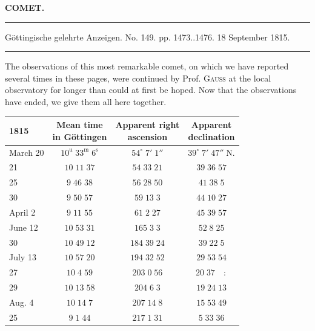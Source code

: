 \clearpage{}\hypertarget{native-394-lower}{}\label{native-394-lower}
\begin{center}\textbf{COMET.}\par\vspace{4pt}\hrule\vspace{4pt}\fontsize{10}{12}\selectfont Göttingische gelehrte Anzeigen. No. 149. pp. 1473..1476. 18 September 1815.\par\vspace{4pt}\hrule\vspace{4pt}\end{center}

\par\indent The observations of this most remarkable comet, on which we have reported several times in these pages, were continued by Prof. \textsc{Gauss} at the local observatory for longer than could at first be hoped. Now that the observations have ended, we give them all here together.

\begin{center}\fontsize{10}{12}\selectfont\setlength{\tabcolsep}{5pt}\renewcommand{\arraystretch}{1.15}\begin{tabular}{l|c|c|c}
1815 & \shortstack{Mean time\\in Göttingen} & \shortstack{Apparent right\\ascension} & \shortstack{Apparent\\declination}\\\hline
March 20 & $10^{\mathrm u}\;33^{\mathrm m}\;6^{\mathrm s}$ & $54^\circ\;7'\;1''$ & $39^\circ\;7'\;47''\;\mathrm{N.}$\\
21 & $10\;11\;37$ & $54\;33\;21$ & $39\;36\;57$\\
25 & $9\;46\;38$ & $56\;28\;50$ & $41\;38\;5$\\
30 & $9\;50\;57$ & $59\;13\;3$ & $44\;10\;27$\\
April 2 & $9\;11\;55$ & $61\;2\;27$ & $45\;39\;57$\\
June 12 & $10\;53\;31$ & $165\;3\;3$ & $52\;8\;25$\\
30 & $10\;49\;12$ & $184\;39\;24$ & $39\;22\;5$\\
July 13 & $10\;57\;20$ & $194\;32\;52$ & $29\;53\;54$\\
27 & $10\;4\;59$ & $203\;0\;56$ & $20\;37\quad:$\\
29 & $10\;13\;58$ & $204\;6\;3$ & $19\;24\;13$\\
Aug. 4 & $10\;14\;7$ & $207\;14\;8$ & $15\;53\;49$\\
25 & $9\;1\;44$ & $217\;1\;31$ & $5\;33\;36$\\
\end{tabular}\end{center}

